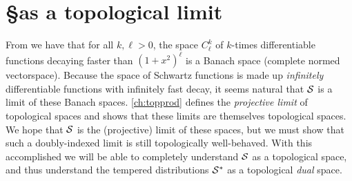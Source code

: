     \section{\S as a topological limit}
      
      From  we have that for all $k,\ell>0$, the space $C^k_\ell$ of $k$-times differentiable functions decaying faster than $(1+x^2)^\ell$ is a Banach space (complete normed vectorspace).
      Because the space of Schwartz functions is made up \emph{infinitely} differentiable functions with infinitely fast decay, it seems natural that $\S$ is a limit of these Banach spaces.
      \autoref{ch:topprod} defines the \emph{projective limit} of topological spaces and shows that these limits are themselves topological spaces.
      We hope that $\S$ is the (projective) limit of these spaces, but we must show that such a doubly-indexed limit is still topologically well-behaved.
      With this accomplished we will be able to completely understand $\S$ as a topological space, and thus understand the tempered distributions $\S^*$ as a topological \emph{dual} space.

